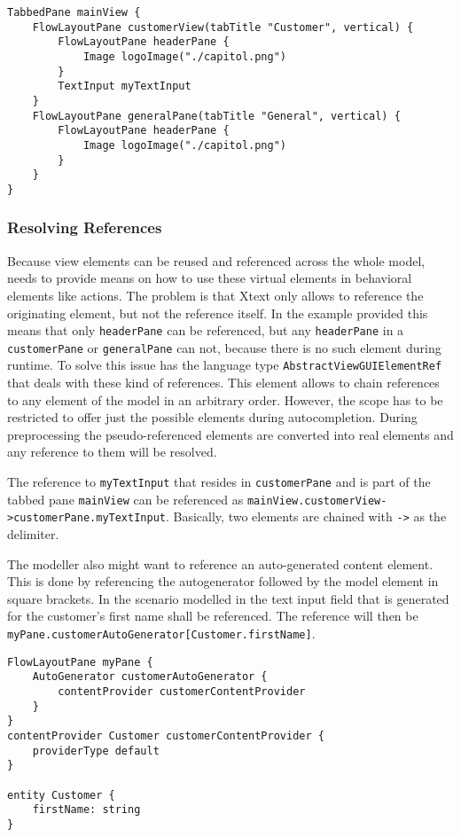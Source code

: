 \begin{lstlisting}[language=MD2]
TabbedPane mainView {
	FlowLayoutPane customerView(tabTitle "Customer", vertical) {
		FlowLayoutPane headerPane {
			Image logoImage("./capitol.png")
	    }
		TextInput myTextInput
	}
	FlowLayoutPane generalPane(tabTitle "General", vertical) {
		FlowLayoutPane headerPane {
			Image logoImage("./capitol.png")
		}
	}
}
\end{lstlisting}

\subsubsection{Resolving References}
Because view elements can be reused and referenced across the whole model, \MD needs to provide means on how to use these virtual elements in behavioral elements like actions. The problem is that Xtext only allows to reference the originating element, but not the reference itself. In the example provided this means that only \lstinline!headerPane! can be referenced, but any \lstinline!headerPane! in a \lstinline!customerPane! or \lstinline!generalPane! can not, because there is no such element during runtime. To solve this issue \MD has the language type \lstinline!AbstractViewGUIElementRef! that deals with these kind of references. This element allows to chain references to any element of the model in an arbitrary order. However, the scope has to be restricted to offer just the possible elements during autocompletion. During preprocessing the pseudo-referenced elements are converted into real elements and any reference to them will be resolved.

The reference to \lstinline!myTextInput! that resides in \lstinline!customerPane! and is part of the tabbed pane \lstinline!mainView! can be referenced as \lstinline!mainView.customerView->customerPane.myTextInput!. Basically, two elements are chained with \lstinline!->! as the delimiter.

The modeller also might want to reference an auto-generated content element. This is done by referencing the autogenerator followed by the model element in square brackets. In the scenario modelled in  the text input field that is generated for the customer’s first name shall be referenced. 
The reference will then be \lstinline!myPane.customerAutoGenerator[Customer.firstName]!.

\begin{lstlisting}[language=MD2, caption=Model using automatically generated view elements, label=lst:reference-autogenerator]
FlowLayoutPane myPane {
	AutoGenerator customerAutoGenerator {
		contentProvider customerContentProvider
	}
}
contentProvider Customer customerContentProvider {
	providerType default
}

entity Customer {
	firstName: string
}
\end{lstlisting}

